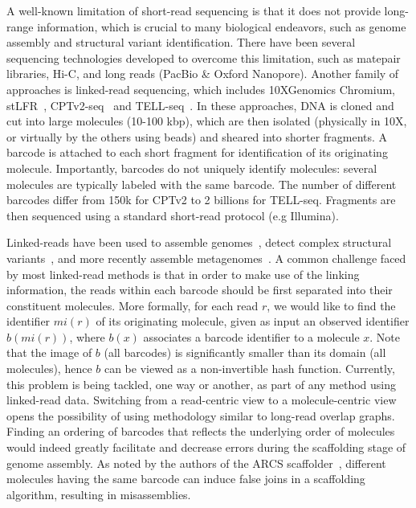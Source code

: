 \documentclass[a4paper,UKenglish,cleveref, autoref, thm-restate,authorcolumns]{lipics-v2019}
\begin{document}
A well-known limitation of short-read sequencing is that it does not provide long-range information, which is crucial to many biological endeavors, such as genome assembly and structural variant identification.
There have been several sequencing technologies developed to overcome this limitation, such as matepair libraries, Hi-C, and long reads (PacBio \& Oxford Nanopore).
Another family of approaches is linked-read sequencing, which includes 10XGenomics Chromium, stLFR~\cite{Wang2019}, CPTv2-seq~\cite{Zhang2017} and TELL-seq~\cite{Chen2019}.
In these approaches, DNA is cloned and cut into large molecules (10-100 kbp), which are then isolated (physically in 10X, or virtually by the others using beads) %
and sheared into shorter fragments. A barcode is attached to each short fragment for identification of its originating molecule.
Importantly, barcodes do not uniquely identify molecules: several molecules are typically labeled with the same barcode.
The number of different barcodes differ from 150k for CPTv2 to 2 billions for TELL-seq.
Fragments are then sequenced using a standard short-read protocol (e.g Illumina).


Linked-reads have been used to assemble genomes~\cite{supernova}, detect complex structural variants~\cite{greer2017linked}, and more
recently assemble metagenomes~\cite{athena}. A common challenge faced by most linked-read methods is that in order
to make use of the linking information, the reads within each barcode should be first separated into their
constituent molecules. 
More formally, for each read $r$, we would like to find the identifier $mi(r)$ of its
originating molecule, given as input an observed identifier $b(mi(r))$, where $b(x)$ associates a barcode identifier
to a molecule $x$. Note that the image of $b$ (all barcodes) is significantly smaller than its domain (all molecules),
hence $b$ can be viewed as a non-invertible hash function. Currently, this problem is being tackled, one way
or another, as part of any method using linked-read data. 
%
Switching from a read-centric %
view to a molecule-centric view opens the possibility of using  methodology similar to long-read overlap graphs. Finding an ordering of barcodes that reflects the underlying order of molecules would indeed greatly facilitate and decrease errors during the scaffolding stage of genome assembly. As noted by the authors of the ARCS scaffolder~\cite{arcs}, different molecules having the same barcode can induce false joins in a scaffolding algorithm, resulting in misassemblies.
\end{document}
